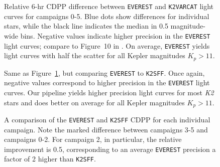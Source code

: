\documentclass[]{emulateapj}
\begin{document}
\begin{figure}[h]
  \begin{center}
       \caption{Relative 6-hr CDPP difference between \texttt{EVEREST}
                and \texttt{K2VARCAT} light curves for campaigns 0-5. Blue dots
                show differences for individual stars, while the black line
                indicates the median in 0.5 magnitude-wide bins. Negative
                values indicate higher precision in the \texttt{EVEREST}
                light curves; compare to Figure~10 in \cite{AIG16}. On average, \texttt{EVEREST} yields
                light curves with half the scatter for all Kepler magnitudes $K_p > 11$.}
     \label{fig:comparison_k2varcat}
  \end{center}
\end{figure}
\begin{figure}[h]
  \begin{center}
       \caption{Same as Figure~\ref{fig:comparison_k2varcat}, but comparing 
                \texttt{EVEREST} to \texttt{K2SFF}. Once again, negative values
                correspond to higher precision in the \texttt{EVEREST} light curves.
                Our pipeline yields higher
                precision light curves for most \emph{K2} stars and does
                better on average for all Kepler magnitudes $K_p > 11$.}
     \label{fig:comparison_k2sff}
  \end{center}
\end{figure}
\begin{figure}[h]
  \begin{center}
       \caption{A comparison of the \texttt{EVEREST} and \texttt{K2SFF} CDPP for
                each individual campaign. Note the marked difference between
                campaigns 3-5 and campaigns 0-2. For campaign 2, in particular,
                the relative improvement is 0.5, corresponding to an average
                \texttt{EVEREST} precision a factor of 2 higher than \texttt{K2SFF}.}
     \label{fig:comparison_k2sff_by_campaign}
  \end{center}
\end{figure}
\end{document}
